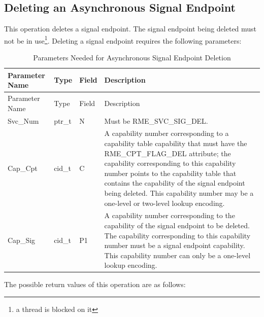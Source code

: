 \subsection{Deleting an Asynchronous Signal Endpoint}\label{subsec:5-delete-async-signal-endpoint}

This operation deletes a signal endpoint. The signal endpoint being deleted must not be in use\footnote{a thread is blocked on it}. Deleting a signal endpoint requires the following parameters:

\begin{xltabular}{\textwidth}{@{}>{\hsize\raggedright\arraybackslash}X>{\hsize\raggedright\arraybackslash}X>{\hsize\raggedright\arraybackslash}X>{\hsize\raggedright\arraybackslash}X@{}}
\caption{Parameters Needed for Asynchronous Signal Endpoint Deletion}\label{tab:5-18-delete-signal-endpoint-parameters}\\
\toprule
Parameter Name & Type & Field & Description\tabularnewline
\endfirsthead
\toprule
Parameter Name & Type & Field & Description\tabularnewline
\midrule
\endhead
\bottomrule
\endlastfoot
Svc\_Num & ptr\_t & N & Must be RME\_SVC\_SIG\_DEL.\tabularnewline
Cap\_Cpt & cid\_t & C &
A capability number corresponding to a capability table capability that must have the RME\_CPT\_FLAG\_DEL attribute; the capability corresponding to this capability number points to the capability table that contains the capability of the signal endpoint being deleted. This capability number may be a one-level or two-level lookup encoding.\tabularnewline
Cap\_Sig & cid\_t & P1 &
A capability number corresponding to the capability of the signal endpoint to be deleted. The capability corresponding to this capability number must be a signal endpoint capability. This capability number can only be a one-level lookup encoding.\tabularnewline
\end{xltabular}
\nopagebreak[4]

The possible return values of this operation are as follows:

